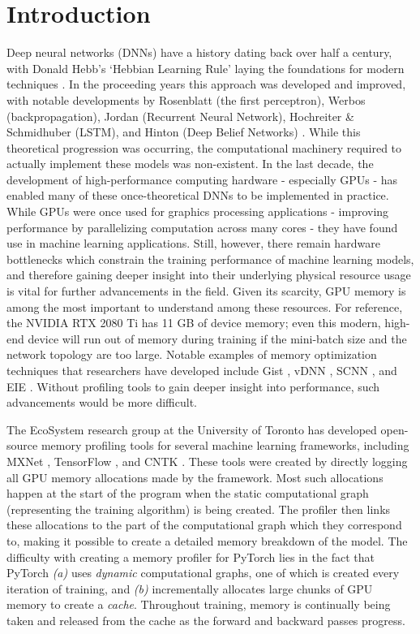 \documentclass[12pt,letterpaper]{article}
\begin{document}
\section{Introduction}
Deep neural networks (DNNs) have a history dating back over half a century, with Donald Hebb's \enquote*{Hebbian Learning Rule} laying the foundations for modern techniques \cite{dnn_history}. In the proceeding years this approach was developed and improved, with notable developments by Rosenblatt (the first perceptron), Werbos (backpropagation), Jordan (Recurrent Neural Network), Hochreiter \& Schmidhuber (LSTM), and Hinton (Deep Belief Networks) \cite{dnn_history}. While this theoretical progression was occurring, the computational machinery required to actually implement these models was non-existent. In the last decade, the development of high-performance computing hardware - especially GPUs - has enabled many of these once-theoretical DNNs to be implemented in practice. While GPUs were once used for graphics processing applications - improving performance by parallelizing computation across many cores - they have found use in machine learning applications. Still, however, there remain hardware bottlenecks which constrain the training performance of machine learning models, and therefore gaining deeper insight into their underlying physical resource usage is vital for further advancements in the field. Given its scarcity, GPU memory is among the most important to understand among these resources. For reference, the NVIDIA RTX 2080 Ti has 11 GB of device memory; even this modern, high-end device will run out of memory during training if the mini-batch size and the network topology are too large. Notable examples of memory optimization techniques that researchers have developed include Gist \cite{gist}, vDNN \cite{vdnn}, SCNN \cite{scnn}, and EIE \cite{eie}. Without profiling tools to gain deeper insight into performance, such advancements would be more difficult. \par

The EcoSystem research group at the University of Toronto has developed open-source memory profiling tools for several machine learning frameworks, including MXNet \cite{mxnet_profiler}, TensorFlow \cite{tensorflow}, and CNTK \cite{cntk}. These tools were created by directly logging all GPU memory allocations made by the framework. Most such allocations happen at the start of the program when the static computational graph (representing the training algorithm) is being created. The profiler then links these allocations to the part of the computational graph which they correspond to, making it possible to create a detailed memory breakdown of the model. The difficulty with creating a memory profiler for PyTorch lies in the fact that PyTorch \textit{(a)} uses \textit{dynamic} computational graphs, one of which is created every iteration of training, and \textit{(b)} incrementally allocates large chunks of GPU memory to create a \textit{cache}. Throughout training, memory is continually being taken and released from the cache as the forward and backward passes progress. \par 
\end{document}
